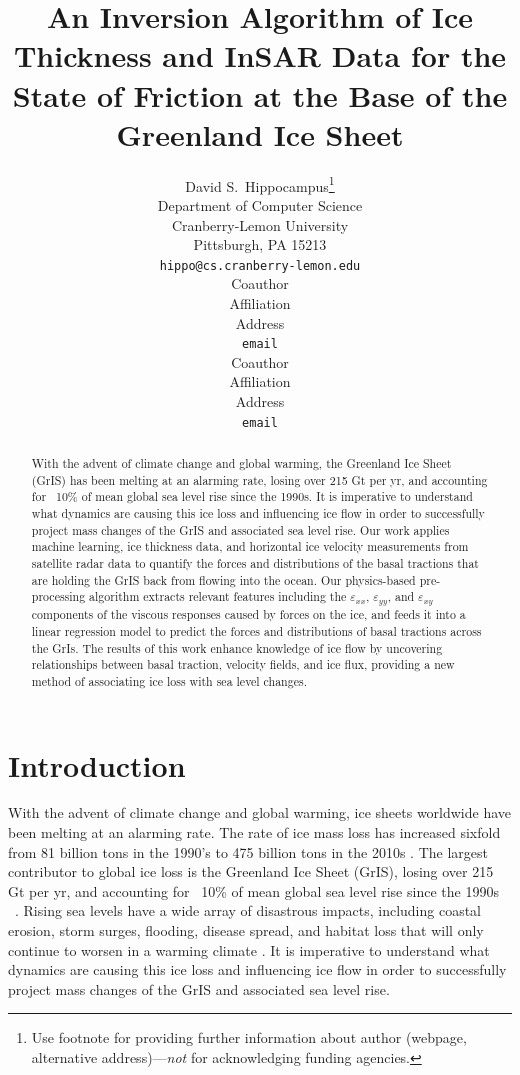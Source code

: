 \documentclass{article}
\title{An Inversion Algorithm of Ice Thickness and InSAR Data for
the State of Friction at the Base of the Greenland Ice Sheet}
\author{%
  David S.~Hippocampus\thanks{Use footnote for providing further information
    about author (webpage, alternative address)---\emph{not} for acknowledging
    funding agencies.} \\
  Department of Computer Science\\
  Cranberry-Lemon University\\
  Pittsburgh, PA 15213 \\
  \texttt{hippo@cs.cranberry-lemon.edu} \\
   \And
   Coauthor \\
   Affiliation \\
   Address \\
   \texttt{email} \\
   \AND
   Coauthor \\
   Affiliation \\
   Address \\
   \texttt{email} \\
}
\begin{document}
\maketitle

\begin{abstract}
With the advent of climate change and global warming, the Greenland Ice Sheet (GrIS) has been melting at an alarming rate, losing over 215 Gt per yr, and accounting for ~10\% of mean global sea level rise since the 1990s. It is imperative to understand what dynamics are causing this ice loss and influencing ice flow in order to successfully project mass changes of the GrIS and associated sea level rise. Our work applies machine learning, ice thickness data, and horizontal ice velocity measurements from satellite radar data to quantify the forces and distributions of the basal tractions that are holding the GrIS back from flowing into the ocean. Our physics-based pre-processing algorithm extracts relevant features including the $\varepsilon_{xx}$, $\varepsilon_{yy}$, and $\varepsilon_{xy}$ components of the viscous responses caused by forces on the ice, and feeds it into a linear regression model to predict the forces and distributions of basal tractions across the GrIs. The results of this work enhance knowledge of ice flow by uncovering relationships between basal traction, velocity fields, and ice flux, providing a new method of associating ice loss with sea level changes.
\end{abstract}

\section{Introduction}

With the advent of climate change and global warming, ice sheets worldwide have been melting at an alarming rate. The rate of ice mass loss has increased sixfold from 81 billion tons in the 1990’s to 475 billion tons in the 2010s \cite{the_imbie_team_mass_2020}. The largest contributor to global ice loss is the Greenland Ice Sheet (GrIS), losing over 215 Gt per yr, and accounting for ~10\% of mean global sea level rise since the 1990s ~\cite{stocker_climate_2013}. Rising sea levels have a wide array of disastrous impacts, including coastal erosion, storm surges, flooding, disease spread, and habitat loss that will only continue to worsen in a warming climate \cite{pattyn_greenland_2018}. It is imperative to understand what dynamics are causing this ice loss and influencing ice flow in order to successfully project mass changes of the GrIS and associated sea level rise.
\end{document}
